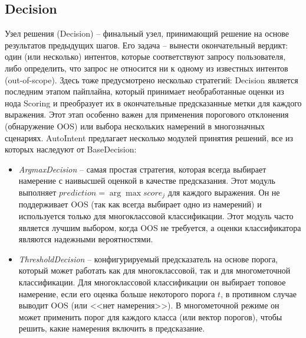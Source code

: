 \documentclass[14pt,a4paper,oneside,openany]{extbook}
\begin{document}
\subsection{Decision}
\label{sec:org91b9022}
Узел решения (Decision) – финальный узел, принимающий решение на основе результатов предыдущих шагов. Его задача – вынести окончательный вердикт: один (или несколько) интентов, которые соответствуют запросу пользователя, либо определить, что запрос не относится ни к одному из известных интентов (out-of-scope). Здесь тоже предусмотрено несколько стратегий: Decision является последним этапом пайплайна, который принимает необработанные оценки из нода Scoring и преобразует их в окончательные предсказанные метки для каждого выражения. Этот этап особенно важен для применения порогового отклонения (обнаружение OOS) или выбора нескольких намерений в многозначных сценариях. AutoIntent предлагает несколько модулей принятия решений, все из которых наследуют от BaseDecision:

\begin{itemize}
\item \emph{ArgmaxDecision} -- самая простая стратегия, которая всегда выбирает намерение с наивысшей оценкой в качестве предсказания. Этот модуль выполняет \(prediction = \arg\max score_j\) для каждого выражения. Он не поддерживает OOS (так как всегда выбирает одно из намерений) и используется только для многоклассовой классификации. Этот модуль часто является лучшим выбором, когда OOS не требуется, а оценки классификатора являются надежными вероятностями.

\item \emph{ThresholdDecision} -- конфигурируемый предсказатель на основе порога, который может работать как для многоклассовой, так и для многометочной классификации. Для многоклассовой классификации он выбирает топовое намерение, если его оценка больше некоторого порога \(t\), в противном случае выводит OOS (или {}<<нет намерения>>{}). В многометочной режиме он может применить порог для каждого класса (или вектор порогов), чтобы решить, какие намерения включить в предсказание.
\end{itemize}
\end{document}
